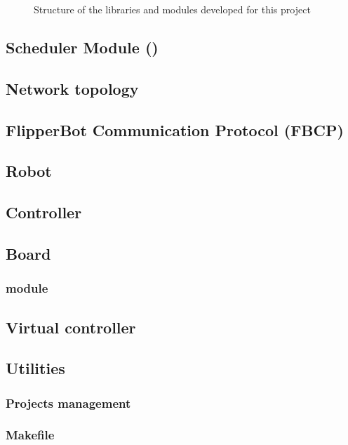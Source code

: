 \begin{figure}[htbp]
  
  \caption{Structure of the libraries and modules developed for this project}
  \label{fig:softtree}
\end{figure}

\subsection{Scheduler Module (\ScheMo{})}
  \label{ssec:schemo}
  

\subsection{Network topology}
  \label{ssec:network}
  

\subsection{FlipperBot Communication Protocol (FBCP)}
  \label{ssec:fbcp}
  
  
\subsection{Robot}
  \label{ssec:robot}
  
  
\subsection{Controller}
  \label{ssec:contr}
  
  
\subsection{Board}
  \label{ssec:board}
  
  \subsubsection{ module}
  
\subsection{Virtual controller}
  \label{ssec:vcontr}
  

\subsection{Utilities}
  \label{ssec:utils}
  
  \subsubsection{Projects management}
  \subsubsection{Makefile}
